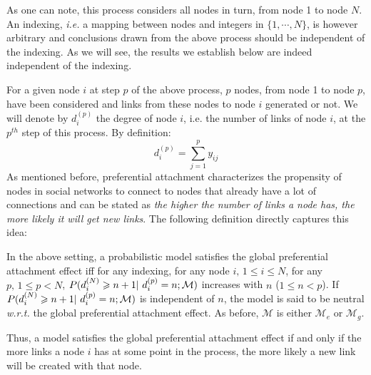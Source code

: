 
As one can note, this process considers all nodes in turn, from node 1 to node $N$. An indexing, \textit{i.e.} a mapping between nodes and integers in $\{1,\cdots,N\}$, is however arbitrary and conclusions drawn from the above process should be independent of the indexing. As we will see, the results we establish below are indeed independent of the indexing.

For a given node $i$ at step $p$ of the above process, $p$ nodes, from node 1 to node $p$, have been considered and links from these nodes to node $i$ generated or not. We will denote by $d_i^{(p)}$ the degree of node $i$, i.e. the number of links of node $i$, at the $p^{th}$ step of this process. By definition:
%
\begin{equation} \label{eq:degree_def}
d_i^{(p)} = \sum_{j=1}^p y_{ij}
\end{equation}
%
As mentioned before, preferential attachment characterizes the propensity of nodes in social networks to connect to nodes that already have a lot of connections and can be stated as \textit{the higher the number of links a node has, the more likely it will get new links}. The following definition directly captures this idea:
%
\begin{definition}
In the above setting, a probabilistic model satisfies the global preferential attachment effect iff for any indexing, for any node $i, \, 1 \leq i \leq N$, for any $p, \, 1 \leq p < N$, $P(d_i^{(N)} \geq n+1 | d_i^{(p)} = n; \M)$ increases with $n$ ($1 \leq n < p$). If $P(d_i^{(N)} \geq n+1 | d_i^{(p)} = n; \M)$ is independent of $n$, the model is said to be neutral \textit{w.r.t.} the global preferential attachment effect. As before, $\mathcal{M}$ is either $\mathcal{M}_e$ or $\mathcal{M}_g$.
\end{definition}
%
Thus, a model satisfies the global preferential attachment effect if and only if the more links a node $i$ has at some point in the process, the more likely a new link will be created with that node.

